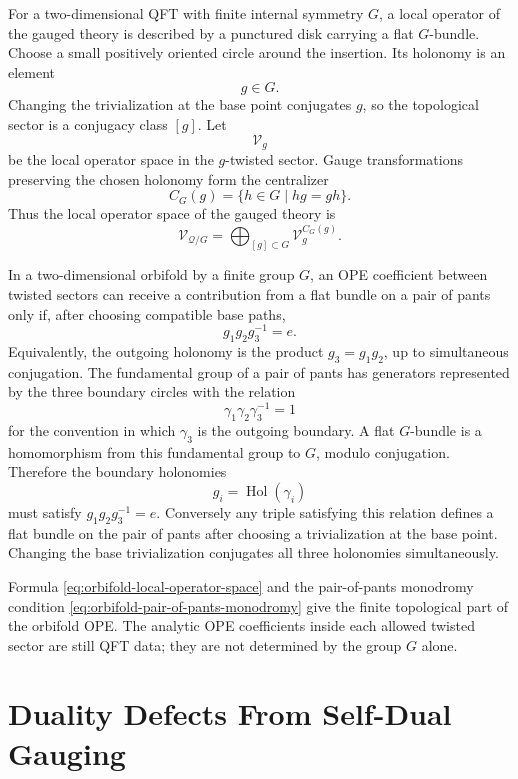 For a two-dimensional QFT with finite internal symmetry \(G\), a local
operator of the gauged theory is described by a punctured disk carrying a flat
\(G\)-bundle.  Choose a small positively oriented circle around the insertion.
Its holonomy is an element
\[
  g\in G.
\]
Changing the trivialization at the base point conjugates \(g\), so the
topological sector is a conjugacy class \([g]\).  Let
\[
  \mathcal V_g
\]
be the local operator space in the \(g\)-twisted sector.  Gauge
transformations preserving the chosen holonomy form the centralizer
\[
  C_G(g)=\{h\in G\mid hg=gh\}.
\]
Thus the local operator space of the gauged theory is
\begin{equation}
  \mathcal V_{\mathcal Q/G}
  =
  \bigoplus_{[g]\subset G}
  \mathcal V_g^{C_G(g)}.
  \label{eq:orbifold-local-operator-space}
\end{equation}

In a two-dimensional orbifold by a finite group \(G\), an OPE coefficient
between twisted sectors can receive a contribution from a flat bundle on a
pair of pants only if, after choosing compatible base paths,
\begin{equation}
  g_1g_2g_3^{-1}=e.
  \label{eq:orbifold-pair-of-pants-monodromy}
\end{equation}
Equivalently, the outgoing holonomy is the product \(g_3=g_1g_2\), up to
simultaneous conjugation.
The fundamental group of a pair of pants has generators represented by the
three boundary circles with the relation
\[
  \gamma_1\gamma_2\gamma_3^{-1}=1
\]
for the convention in which \(\gamma_3\) is the outgoing boundary.  A flat
\(G\)-bundle is a homomorphism from this fundamental group to \(G\), modulo
conjugation.  Therefore the boundary holonomies
\[
  g_i=\operatorname{Hol}(\gamma_i)
\]
must satisfy \(g_1g_2g_3^{-1}=e\).  Conversely any triple satisfying this
relation defines a flat bundle on the pair of pants after choosing a
trivialization at the base point.  Changing the base trivialization conjugates
all three holonomies simultaneously.

Formula \eqref{eq:orbifold-local-operator-space} and
the pair-of-pants monodromy condition \eqref{eq:orbifold-pair-of-pants-monodromy} give the finite
topological part of the orbifold OPE.  The analytic OPE coefficients inside
each allowed twisted sector are still QFT data; they are not determined by
the group \(G\) alone.

\section{Duality Defects From Self-Dual Gauging}

